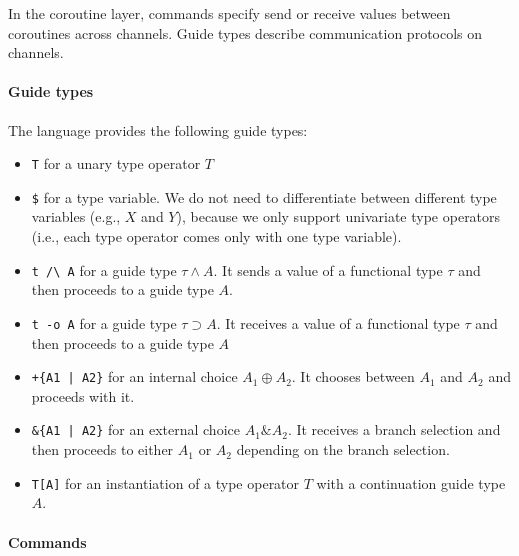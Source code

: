 In the coroutine layer, commands specify send or receive values between
coroutines across channels.
%
Guide types describe communication protocols on channels.

\paragraph{Guide types}

The language provides the following guide types:
\begin{itemize}
  \item \texttt{T} for a unary type operator $T$
  \item \texttt{\$} for a type variable.
        We do not need to differentiate between different type variables (e.g.,
        $X$ and $Y$), because we only support univariate type operators (i.e.,
        each type operator comes only with one type variable).
  \item \verb$t /\ A$ for a guide type $\tau \land A$.
        It sends a value of a functional type $\tau$ and then proceeds to a
        guide type $A$.
  \item \texttt{t -o A} for a guide type $\tau \supset A$.
        It receives a value of a functional type $\tau$ and then proceeds to a
        guide type $A$
  \item \verb$+{A1 | A2}$ for an internal choice $A_1 \oplus A_2$.
        It chooses between $A_1$ and $A_2$ and proceeds with it.
  \item \verb$&{A1 | A2}$ for an external choice $A_1 \mathrel{\&} A_2$.
        It receives a branch selection and then proceeds to either $A_1$ or
        $A_2$ depending on the branch selection.
  \item \texttt{T[A]} for an instantiation of a type operator $T$ with a
        continuation guide type $A$.
\end{itemize}

\paragraph{Commands}

